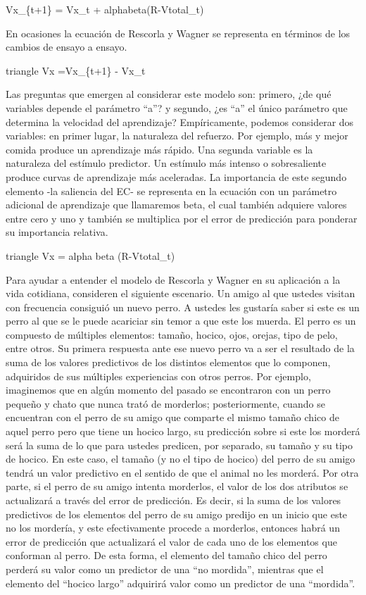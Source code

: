 \documentclass[
  a4paper,
  DIV=11,
  numbers=noendperiod]{scrreprt}
\begin{document}
Vx\_\{t+1\} = Vx\_t + alphabeta(R-Vtotal\_t)

En ocasiones la ecuación de Rescorla y Wagner se representa en términos
de los cambios de ensayo a ensayo.

triangle Vx =Vx\_\{t+1\} - Vx\_t

Las preguntas que emergen al considerar este modelo son: primero, ¿de
qué variables depende el parámetro ``a''? y segundo, ¿es ``a'' el único
parámetro que determina la velocidad del aprendizaje? Empíricamente,
podemos considerar dos variables: en primer lugar, la naturaleza del
refuerzo. Por ejemplo, más y mejor comida produce un aprendizaje más
rápido. Una segunda variable es la naturaleza del estímulo predictor. Un
estímulo más intenso o sobresaliente produce curvas de aprendizaje más
aceleradas. La importancia de este segundo elemento -la saliencia del
EC- se representa en la ecuación con un parámetro adicional de
aprendizaje que llamaremos beta, el cual también adquiere valores entre
cero y uno y también se multiplica por el error de predicción para
ponderar su importancia relativa.

triangle Vx = alpha beta (R-Vtotal\_t)

Para ayudar a entender el modelo de Rescorla y Wagner en su aplicación a
la vida cotidiana, consideren el siguiente escenario. Un amigo al que
ustedes visitan con frecuencia consiguió un nuevo perro. A ustedes les
gustaría saber si este es un perro al que se le puede acariciar sin
temor a que este los muerda. El perro es un compuesto de múltiples
elementos: tamaño, hocico, ojos, orejas, tipo de pelo, entre otros. Su
primera respuesta ante ese nuevo perro va a ser el resultado de la suma
de los valores predictivos de los distintos elementos que lo componen,
adquiridos de sus múltiples experiencias con otros perros. Por ejemplo,
imaginemos que en algún momento del pasado se encontraron con un perro
pequeño y chato que nunca trató de morderlos; posteriormente, cuando se
encuentran con el perro de su amigo que comparte el mismo tamaño chico
de aquel perro pero que tiene un hocico largo, su predicción sobre si
este los morderá será la suma de lo que para ustedes predicen, por
separado, su tamaño y su tipo de hocico. En este caso, el tamaño (y no
el tipo de hocico) del perro de su amigo tendrá un valor predictivo en
el sentido de que el animal no les morderá. Por otra parte, si el perro
de su amigo intenta morderlos, el valor de los dos atributos se
actualizará a través del error de predicción. Es decir, si la suma de
los valores predictivos de los elementos del perro de su amigo predijo
en un inicio que este no los mordería, y este efectivamente procede a
morderlos, entonces habrá un error de predicción que actualizará el
valor de cada uno de los elementos que conforman al perro. De esta
forma, el elemento del tamaño chico del perro perderá su valor como un
predictor de una ``no mordida'', mientras que el elemento del ``hocico
largo'' adquirirá valor como un predictor de una ``mordida''.
\end{document}

